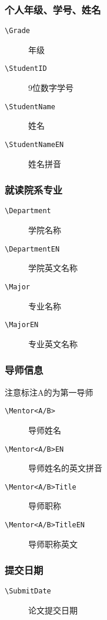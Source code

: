 \subsubsection{个人年级、学号、姓名}
\begin{description}
    \item[\texttt{\textbackslash Grade}] 年级
    \item[\texttt{\textbackslash StudentID}] 9位数字学号
    \item[\texttt{\textbackslash StudentName}] 姓名
    \item[\texttt{\textbackslash StudentName\textunderscore EN}] 姓名拼音 
\end{description}

\subsubsection{就读院系专业}
\begin{description}
    \item[\texttt{\textbackslash Department}] 学院名称
    \item[\texttt{\textbackslash Department\textunderscore EN}] 学院英文名称
    \item[\texttt{\textbackslash Major}] 专业名称
    \item[\texttt{\textbackslash Major\textunderscore EN}] 专业英文名称
\end{description}

\subsubsection{导师信息}
注意标注A的为第一导师
\begin{description}
    \item[\texttt{\textbackslash Mentor<A/B>}] 导师姓名
    \item[\texttt{\textbackslash Mentor<A/B>\textunderscore EN}] 导师姓名的英文拼音  
    \item[\texttt{\textbackslash Mentor<A/B>Title}] 导师职称
    \item[\texttt{\textbackslash Mentor<A/B>Title\textunderscore EN}] 导师职称英文
\end{description}

\subsubsection{提交日期}
\begin{description}
    \item[\texttt{\textbackslash SubmitDate}] 论文提交日期
\end{description}

